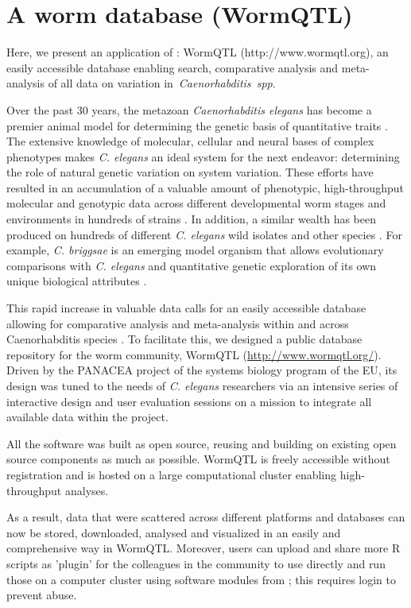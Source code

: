 \section{A worm database (WormQTL)}
Here, we present an application of \xqtlwb: WormQTL (http://www.wormqtl.org), an 
easily accessible database enabling search, comparative analysis and meta-analysis of all 
data on variation in \emph{Caenorhabditis spp}. 

Over the past 30 years, the metazoan \emph{Caenorhabditis elegans} has become a premier animal model for 
determining the genetic basis of quantitative traits \cite{Gaertner:2010, Kammenga:2008}. The 
extensive knowledge of molecular, cellular and neural bases of complex phenotypes makes 
\emph{C. elegans} an ideal system for the next endeavor: determining the role of natural genetic 
variation on system variation. These efforts have resulted in an accumulation of a valuable amount 
of phenotypic, high-throughput molecular and genotypic data across different developmental worm 
stages and environments in hundreds of strains \cite{Palopoli:2008, Kammenga:2007, Rockman:2010, 
McGrath:2009, Reddy:2009, Doroszuk:2009, Li:2010, Gutteling:2007, Vinuela:2010}. In addition, a similar wealth has been 
produced on hundreds of different \emph{C. elegans} wild isolates and other species \cite{Andersen:2012}. 
For example, \emph{C. briggsae} is an emerging model organism that allows evolutionary comparisons 
with \emph{C. elegans} and quantitative genetic exploration of its own unique biological 
attributes \cite{Ross:2011}.

This rapid increase in valuable data calls for an easily accessible database allowing for 
comparative analysis and meta-analysis within and across Caenorhabditis species \cite{Swertz:2007}. To 
facilitate this, we designed a public database repository for the worm community, WormQTL 
(\url{http://www.wormqtl.org/}). Driven by the PANACEA project of the systems biology program of 
the EU, its design was tuned to the needs of \emph{C. elegans} researchers via an intensive 
series of interactive design and user evaluation sessions on a mission to integrate all 
available data within the project.

All the software was built as open source, reusing and building on existing open source components 
as much as possible. WormQTL is freely accessible without registration and is hosted on a large 
computational cluster enabling high-throughput analyses.

As a result, data that were scattered across different platforms and databases can now be 
stored, downloaded, analysed and visualized in an easily and comprehensive way in WormQTL. 
Moreover, users can upload and share more R scripts as 'plugin' for the colleagues in the 
community to use directly and run those on a computer cluster using software modules from 
\xqtlwb \cite{Arends:2012, Snoek:2012}; this requires login to prevent abuse.

